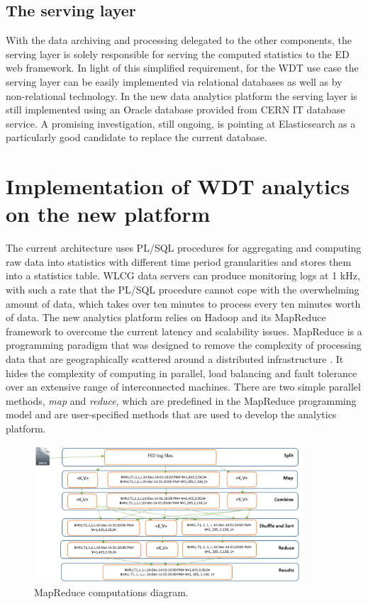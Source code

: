 \subsection{The serving layer}

With the data archiving and processing delegated to the other components,
the serving layer is solely responsible for serving the computed statistics to
the ED web framework. In light of this simplified
requirement, for the WDT use case the serving layer can be easily implemented
via relational databases as well as by non-relational technology. In the new data analytics platform
the serving layer is still implemented using an Oracle database provided from
CERN IT database service. A promising investigation, still ongoing, is pointing at
Elasticsearch as a particularly good candidate to replace the current database.

\section{Implementation of WDT analytics on the new platform}
 
The current architecture uses PL/SQL procedures for aggregating and computing raw data into statistics with different time period granularities and stores them into a statistics table. WLCG data servers can produce monitoring logs at 1 kHz, with such a rate that the PL/SQL procedure cannot cope with the overwhelming amount of data, which takes over ten minutes to process every ten minutes worth of data. The new analytics platform relies on Hadoop and its MapReduce framework to overcome the current latency and scalability issues. MapReduce is a programming paradigm that was designed to remove the complexity of processing data that are geographically scattered around a distributed infrastructure \cite{mrgoogle}. It hides the complexity of computing in parallel, load balancing and fault tolerance over an extensive range of interconnected machines. There are two simple parallel methods, \textit{map} and \textit{reduce}, which are predefined in the MapReduce programming model and are user-specified methods that are used to develop the analytics platform.



\begin{figure}
  \centering
  \includegraphics[width=100mm]{./Figures/MR.png}
  \caption{\small MapReduce computations diagram.}\label{fig:mapframe}
\end{figure}

